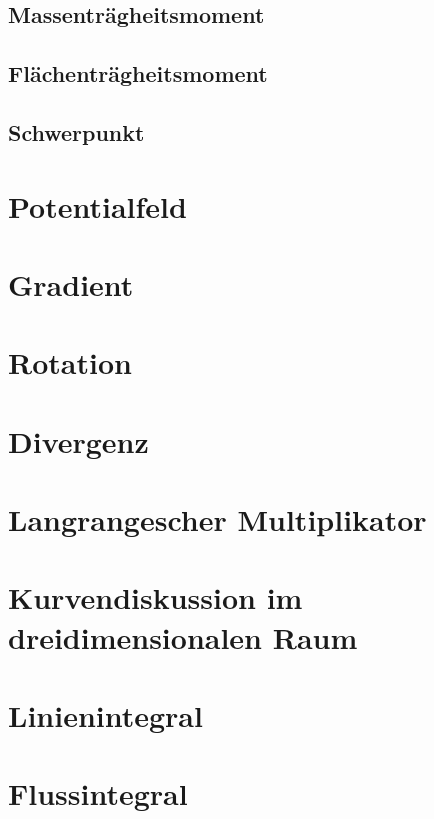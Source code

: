 \subsection{Massenträgheitsmoment}
\subsection{Flächenträgheitsmoment}
\subsection{Schwerpunkt}
\section{Potentialfeld}
\section{Gradient}
\section{Rotation}
\section{Divergenz}
\section{Langrangescher Multiplikator}
\section{Kurvendiskussion im dreidimensionalen Raum}
\section{Linienintegral}
\section{Flussintegral}
